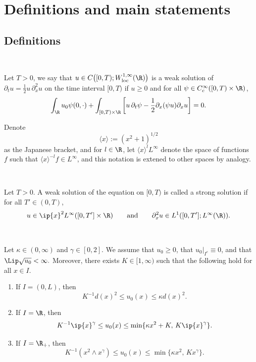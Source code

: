\section{Definitions and main statements}

\subsection{Definitions}

\begin{definition}\ \par
Let $T>0$, we say that
\(
    u\in C\bigl([0,T);W_{\mathrm{loc}}^{1,\infty}(\R)\bigr)
\)
is a weak solution of
\(
    \partial_t u = \frac12 u\,\partial_x^2 u
\)
on the time interval $[0,T)$ if $u\ge 0$ and for all $\psi\in C_c^{\infty}([0,T)\times \R)$,
\[
    \int_{\R} u_0\psi(0,\cdot)
    + \int_{[0,T)\times \R}
    \left[
        u\,\partial_t\psi
        - \frac12 \partial_x(\psi u)\partial_x u
    \right] = 0.
\]
\end{definition}

\begin{definition}
    Denote
    \[
    \langle x\rangle:=(x^2+1)^{1/2}
    \]
    as the Japanese bracket, and for $l\in \R$, let $\langle x\rangle^l L^{\infty}$ denote the space of functions $f$ such that $\langle x\rangle^{-l}f\in L^{\infty}$, and this notation is extened to other spaces by analogy.
\end{definition}

\begin{definition}\ \par
Let $T>0$. A weak solution of the equation on $[0,T)$ is called a strong solution if for all $T'\in(0,T)$,
\[
    u\in \ip{x}^{2}L^{\infty}([0,T']\times \R)
    \qquad \text{and} \qquad
    \partial_x^2u\in L^1([0,T'];L^{\infty}(\R)).
\]
\end{definition}

\begin{definition}\ \par
Let $\kappa\in(0,\infty)$ and $\gamma\in[0,2]$. We assume that $u_0\ge 0$, that $u_0|_{I^c}\equiv 0$, and that
\(
    \Lip \sqrt{u_0}<\infty.
\)
Moreover, there exists $K\in[1,\infty)$ such that the following hold for all $x\in I$.
\end{definition}

\begin{enumerate}[label=(\alph*),leftmargin=2em]
    \item If $I=(0,L)$, then
    \[
        K^{-1}d(x)^2 \le u_0(x) \le \kappa d(x)^2.
    \]

    \item If $I=\R$, then
    \[
        K^{-1}\ip{x}^{\gamma} \le u_0(x)
        \le \min\{\kappa x^2 + K,\, K\ip{x}^{\gamma}\}.
    \]

    \item If $I=\R_+$, then
    \[
        K^{-1}(x^2\wedge x^{\gamma}) \le u_0(x)
        \le \min\{\kappa x^2,\, Kx^{\gamma}\}.
    \]
\end{enumerate}

